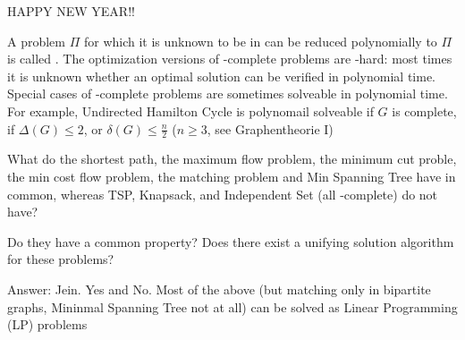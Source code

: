 \begin{lec}[2012-01-09]\end{lec}

HAPPY NEW YEAR!!

\begin{defn}
	A problem $\Pi$ for which it is unknown to be in \npoly can be reduced polynomially to $\Pi$ is called . The optimization versions of \npoly-complete problems are \npoly-hard: most times it is unknown whether an optimal solution can be verified in polynomial time.
	Special cases of \npoly-complete problems are sometimes solveable in polynomial time. For example, Undirected Hamilton Cycle is polynomail solveable if $G$ is complete, if $\Delta(G) \leq 2$, or $\delta(G) \leq \frac n2$ ($n\geq 3$, see Graphentheorie I)

	What do the shortest path, the maximum flow problem, the minimum cut proble, the min cost flow problem, the matching problem and Min Spanning Tree have in common, whereas TSP, Knapsack, and Independent Set (all \npoly-complete) do not have?

	\begin{qstn}
		Do they have a common property? Does there exist a unifying solution algorithm for these problems?
	\end{qstn}

	Answer: Jein. Yes and No. Most of the above (but matching only in bipartite graphs, Mininmal Spanning Tree not at all) can be solved as Linear Programming (LP) problems
\end{defn}
